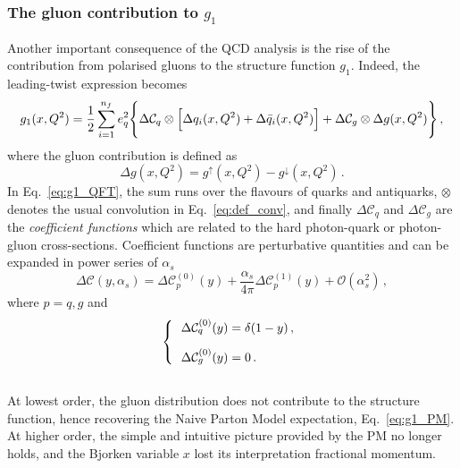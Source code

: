 \subsubsection*{The gluon contribution to $g_1$}
Another important consequence of the QCD analysis is the rise of the contribution from polarised gluons to the structure function $g_1$. Indeed, the leading-twist expression becomes 
\begin{equation}
  g_1(x,Q^2) = \frac{1}{2} \sum_{i=1}^{n_f} e_{q}^2 \Biggl\{ \Delta \mathcal{C}_{q} \otimes \Bigl[ \Delta q_i (x,Q^2) + \Delta \bar{q}_i (x,Q^2) \Bigr] + \Delta \mathcal{C}_{g} \otimes \Delta g (x,Q^2)\Biggr\} \,,
  \label{eq:g1_QFT}
\end{equation}
where the gluon contribution is defined as
\begin{equation}
  \Delta g(x,Q^2) = g^{\uparrow}(x,Q^2) - g^{\downarrow}(x,Q^2) \,.
\end{equation}
In Eq.~\eqref{eq:g1_QFT}, the sum runs over the flavours of quarks and antiquarks, $\otimes$ denotes the usual convolution in Eq.~\eqref{eq:def_conv}, and finally $\Delta \mathcal{C}_{q}$ and $\Delta \mathcal{C}_{g}$ are the \textit{coefficient functions} which are related to the hard photon-quark or photon-gluon cross-sections. Coefficient functions are perturbative quantities and can be expanded in power series of $\alpha_s$
\begin{equation}
  \Delta \mathcal{C} \left( y, \alpha_s \right) = \Delta \mathcal{C}^{(0)}_{p} (y) + \frac{\alpha_s}{4\pi} \Delta \mathcal{C}^{(1)}_{p} (y) + \mathcal{O}(\alpha_s^2)\,,
\end{equation}
where $p=q,g$ and\\
\begin{equation}
  \left\{ \hspace{-3mm}
  \begin{array}{cl}
    &\Delta \mathcal{C}_{q}^{(0)} (y) = \delta(1-y)\,,\\[10pt]
    &\Delta \mathcal{C}_{g}^{(0)} (y) = 0 \,. \\
  \end{array}
  \right.
\end{equation}
\\
At lowest order, the gluon distribution does not contribute to the structure function, hence recovering the Naive Parton Model expectation, Eq.~\eqref{eq:g1_PM}. At higher order, the simple and intuitive picture provided by the PM no longer holds, and the Bjorken variable $x$ lost its interpretation fractional momentum.\par
